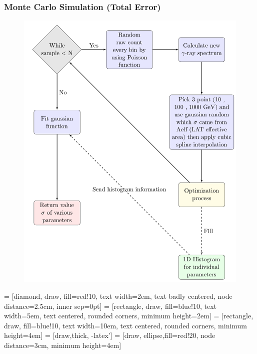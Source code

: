 \documentclass{beamer}
\begin{document}
\begin{frame}\frametitle{Monte Carlo Simulation (Total Error)}
  \begin{figure}[h!]
    \includegraphics[width=0.7\textheight]{montetot}
    \end{figure}
\end{frame}

   = [diamond, draw, fill=red!10, 
  text width=2em, text badly centered, node distance=2.5cm, inner sep=0pt]
   = [rectangle, draw, fill=blue!10, 
  text width=5em, text centered, rounded corners, minimum height=2em]
   = [rectangle, draw, fill=blue!10, 
  text width=10em, text centered, rounded corners, minimum height=4em]
   = [draw,thick, -latex']
   = [draw, ellipse,fill=red!20, node distance=3cm,
  minimum height=4em]
\end{document}
